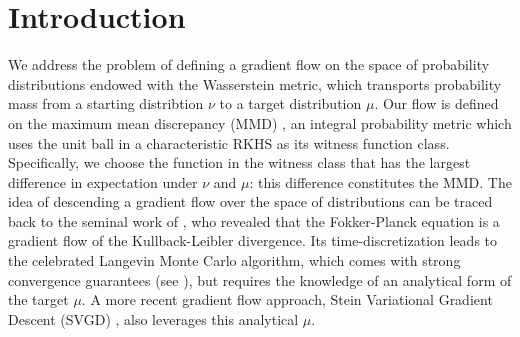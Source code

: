 \section{Introduction}




We address the problem of defining a gradient flow  on the space of probability distributions endowed with the Wasserstein metric, which transports probability mass from a starting distribtion $\nu$ to a target distribution $\mu$.   Our flow is defined on the maximum mean discrepancy (MMD) \cite{gretton2012kernel}, an integral probability metric \cite{Mueller97} which uses the unit ball in a characteristic RKHS \cite{sriperumbudur2010hilbert} as its witness function class.
Specifically, we choose the function in the witness class that has the largest difference in expectation under $\nu$ and $\mu$: this difference constitutes the MMD.
The idea of descending a gradient flow over the space of distributions can be traced back to the seminal work of \cite{jordan1998variational}, who revealed that the Fokker-Planck equation is a gradient flow of the Kullback-Leibler divergence. Its time-discretization leads to the celebrated Langevin Monte Carlo algorithm, which comes with strong convergence guarantees  (see \cite{durmus2018analysis,dalalyan2019user}), but requires the knowledge of an analytical form of the target $\mu$.
A more recent gradient flow approach, Stein Variational Gradient Descent (SVGD) \cite{liu2017stein}, also  leverages this analytical $\mu$.








